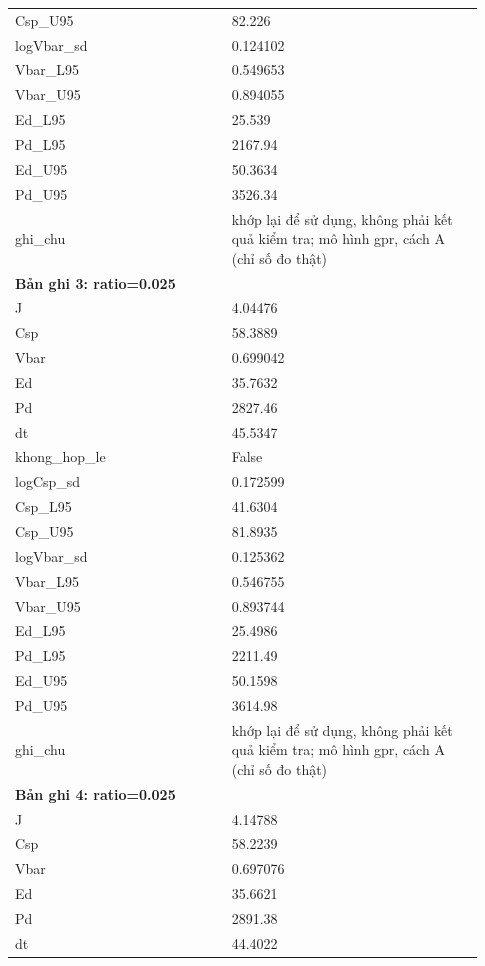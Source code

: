 \begin{longtable}{p{0.43\linewidth}p{0.50\linewidth}}
Csp\_\allowbreak U95 & 82.226 \\
logVbar\_\allowbreak sd & 0.124102 \\
Vbar\_\allowbreak L95 & 0.549653 \\
Vbar\_\allowbreak U95 & 0.894055 \\
Ed\_\allowbreak L95 & 25.539 \\
Pd\_\allowbreak L95 & 2167.94 \\
Ed\_\allowbreak U95 & 50.3634 \\
Pd\_\allowbreak U95 & 3526.34 \\
ghi\_\allowbreak chu & khớp lại để sử dụng, không phải kết quả kiểm tra; mô hình gpr, cách A (chỉ số đo thật) \\
\midrule
\multicolumn{2}{p{0.95\linewidth}}{\textbf{Bản ghi 3: ratio=0.025}} \\
J & 4.04476 \\
Csp & 58.3889 \\
Vbar & 0.699042 \\
Ed & 35.7632 \\
Pd & 2827.46 \\
dt & 45.5347 \\
khong\_\allowbreak hop\_\allowbreak le & False \\
logCsp\_\allowbreak sd & 0.172599 \\
Csp\_\allowbreak L95 & 41.6304 \\
Csp\_\allowbreak U95 & 81.8935 \\
logVbar\_\allowbreak sd & 0.125362 \\
Vbar\_\allowbreak L95 & 0.546755 \\
Vbar\_\allowbreak U95 & 0.893744 \\
Ed\_\allowbreak L95 & 25.4986 \\
Pd\_\allowbreak L95 & 2211.49 \\
Ed\_\allowbreak U95 & 50.1598 \\
Pd\_\allowbreak U95 & 3614.98 \\
ghi\_\allowbreak chu & khớp lại để sử dụng, không phải kết quả kiểm tra; mô hình gpr, cách A (chỉ số đo thật) \\
\midrule
\multicolumn{2}{p{0.95\linewidth}}{\textbf{Bản ghi 4: ratio=0.025}} \\
J & 4.14788 \\
Csp & 58.2239 \\
Vbar & 0.697076 \\
Ed & 35.6621 \\
Pd & 2891.38 \\
dt & 44.4022 \\

\end{longtable}
